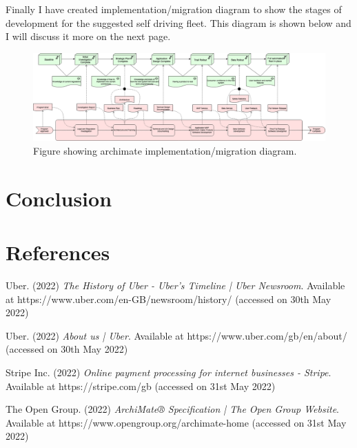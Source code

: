 \documentclass{article}
\begin{document}
    \newpage

    \begin{landscape}
      \noindent Finally I have created implementation/migration diagram to show the stages of development for the suggested self driving fleet. This diagram is shown
      below and I will discuss it more on the next page.

      \vspace{0.5cm}
      \begin{figure}[H]
        \centering
        \includegraphics[width=20cm]{assets/migration.drawio.png}
        \caption{Figure showing archimate implementation/migration diagram.}
        \label{fig:migrationDiagram}
      \end{figure}
    \end{landscape}

    \newpage

    \section{Conclusion}

    \newpage
    \section{References}
    \noindent [1] Uber. (2022) \textit{The History of Uber - Uber's Timeline | Uber Newsroom}. Available at https://www.uber.com/en-GB/newsroom/history/ (accessed on 30th May 2022)
    \vspace{0.2cm}

    \noindent [2] Uber. (2022) \textit{About us | Uber}. Available at https://www.uber.com/gb/en/about/ (accessed on 30th May 2022)
    \vspace{0.2cm}

    \noindent [3] Stripe Inc. (2022) \textit{Online payment processing for internet businesses - Stripe}. Available at https://stripe.com/gb (accessed on 31st May 2022)
    \vspace{0.2cm}

    \noindent [4] The Open Group. (2022) \textit{ArchiMate® Specification | The Open Group Website}. Available at https://www.opengroup.org/archimate-home (accessed on 31st May 2022)
\end{document}
